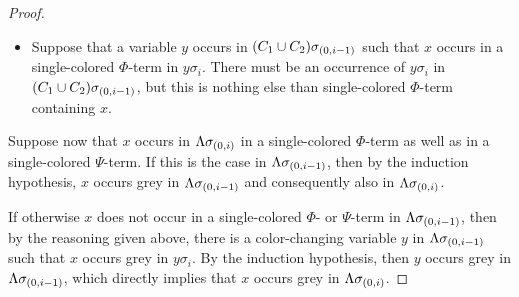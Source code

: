 \documentclass[,%
	draft=false,%
	numbers=noendperiod
	11pt,
	a4paper,
	oneside,%
	openany,
]{memoir}
\begin{document}
\begin{proof}
\begin{itemize}
		\item Suppose that a variable $y$ occurs in $(C_1 \cup C_2)\sigma_{(0,i-1)}$ such that $x$ occurs in a single-colored $\Phi$-term in $y\sigma_i$.
			There must be an occurrence of $y\sigma_i$ in $(C_1 \cup C_2)\sigma_{(0,i-1)}$, but this is nothing else than single-colored $\Phi$-term containing $x$.
	\end{itemize}

	Suppose now that $x$ occurs in $\Lambda\sigma_{(0,i)}$ in a single-colored $\Phi$-term as well as in a single-colored $\Psi$-term.
	If this is the case in $\Lambda\sigma_{(0,i-1)}$, then by the induction hypothesis, $x$ occurs grey in $\Lambda\sigma_{(0,i-1)}$ and consequently also in $\Lambda\sigma_{(0,i)}$.

	If otherwise $x$ does not occur in a single-colored $\Phi$- or $\Psi$-term in $\Lambda\sigma_{(0,i-1)}$, then by the reasoning given above, there is a color-changing variable $y$ in $\Lambda\sigma_{(0,i-1)}$ such that $x$ occurs grey in $y\sigma_i$. 
	By the induction hypothesis, then $y$ occurs grey in $\Lambda\sigma_{(0,i-1)}$, which directly implies that $x$ occurs grey in $\Lambda\sigma_{(0,i)}$.
\end{proof}
\end{document}
